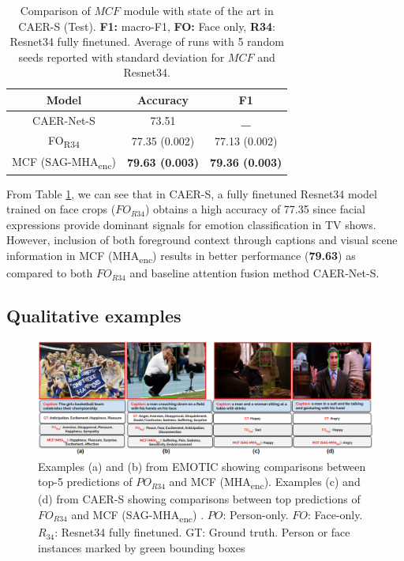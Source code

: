  \begin{table}[h!]
\centering
\begin{tabular}{|c|c|c|}
\hline
\textbf{Model}                               & \textbf{Accuracy}                      & \textbf{F1}                       \\ \hline
CAER-Net-S  \cite{CAER-S}                                & 73.51                             & \textbf{\_}                       \\ \hline
FO\textsubscript{R34}                                    & 77.35 (0.002)                     & 77.13 (0.002)                      \\ \hline
\multicolumn{1}{|l|}{MCF (SAG-MHA\textsubscript{enc})} & \multicolumn{1}{l|}{\textbf{79.63 (0.003)}} & \multicolumn{1}{l|}{\textbf{79.36 (0.003)}}\\ \hline
\end{tabular}
\caption{Comparison of $MCF$ module with state of the art in CAER-S (Test). \textbf{F1:} macro-F1, \textbf{FO:} Face only, \textbf{R34}: Resnet34 fully finetuned. Average of runs with 5 random seeds reported with standard deviation for $MCF$ and Resnet34.}
\label{MCFSAG}
\end{table}
From Table \ref{MCFSAG}, we can see that in CAER-S, a fully finetuned Resnet34 model trained on face crops ($FO_{R34}$) obtains a high accuracy of 77.35 since facial expressions provide dominant signals for emotion classification in TV shows. However, inclusion of both foreground context through captions and visual scene information in MCF (MHA\textsubscript{enc}) results in better performance (\textbf{79.63}) as compared to both $FO_{R34}$ and baseline attention fusion method CAER-Net-S. 

\subsection{Qualitative examples}
\begin{figure}[h!]
    \centering
    \includegraphics[width=\textwidth]{figures/EMOTIC_CAER_examples_updated.png}
    \caption{Examples (a) and (b) from EMOTIC showing comparisons between top-5 predictions of $PO_{R34}$ and MCF (MHA\textsubscript{enc}). Examples (c) and (d) from CAER-S showing comparisons between top predictions of $FO_{R34}$ and MCF (SAG-MHA\textsubscript{enc}) . $PO$: Person-only. $FO$: Face-only. $R_{34}$: Resnet34 fully finetuned. GT: Ground truth. Person or face instances marked by green bounding boxes}
    \label{qualfig}
\end{figure}

